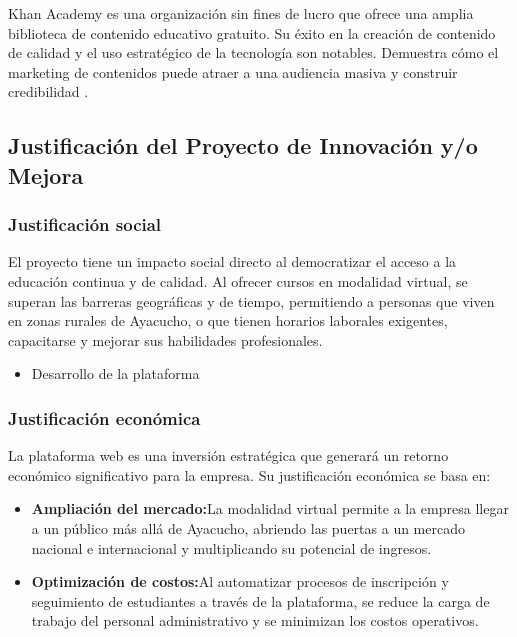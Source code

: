 Khan Academy es una organización sin fines de lucro que ofrece una amplia biblioteca de contenido educativo gratuito. 
Su éxito en la creación de contenido de calidad y el uso estratégico de la tecnología son notables. 
Demuestra cómo el marketing de contenidos puede atraer a una audiencia masiva y construir credibilidad \citep{khan2022}.

\subsection{Justificación del Proyecto de Innovación y/o Mejora}
\subsubsection{Justificación social}
El proyecto tiene un impacto social directo al democratizar el acceso a la educación continua y de calidad. Al ofrecer cursos en modalidad virtual, se superan las barreras geográficas y de tiempo, permitiendo a personas que viven en zonas rurales de Ayacucho, o que tienen horarios laborales exigentes, capacitarse y mejorar sus habilidades profesionales.
\begin{itemize}
	\item {Desarrollo de la plataforma}
\end{itemize}
\subsubsection{Justificación económica}
La plataforma web es una inversión estratégica que generará un retorno económico significativo para la empresa. Su justificación económica se basa en:
\begin{itemize}
	\item \textbf{Ampliación del mercado:}La modalidad virtual permite a la empresa llegar a un público más allá de Ayacucho, abriendo las puertas a un mercado nacional e internacional y multiplicando su potencial de ingresos.
\end{itemize}
\begin{itemize}
	\item \textbf{Optimización de costos:}Al automatizar procesos de inscripción y seguimiento de estudiantes a través de la plataforma, se reduce la carga de trabajo del personal administrativo y se minimizan los costos operativos.
\end{itemize}
